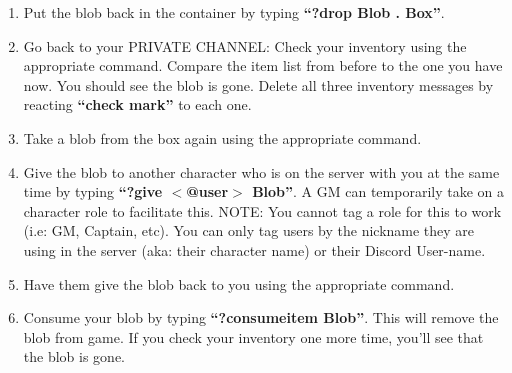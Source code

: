 \documentclass[green]{TMFHope}
\begin{document}
\begin{enumerate}
	\item Put the blob back in the container by typing \textbf{``?drop Blob . Box''}.
	\item Go back to your PRIVATE CHANNEL: Check your inventory using the appropriate command. Compare the item list from before to the one you have now. You should see the blob is gone. Delete all three inventory messages by reacting \textbf{``check mark''} to each one.
	\item Take a blob from the box again using the appropriate command.
	\item Give the blob to another character who is on the server with you at the same time by typing \textbf{``?give $<$@user$>$ Blob''}. A GM can temporarily take on a character role to facilitate this. NOTE: You cannot tag a role for this to work (i.e: GM, Captain, etc). You can only tag users by the nickname they are using in the server (aka: their character name) or their Discord User-name.
	\item Have them give the blob back to you using the appropriate command.
	\item Consume your blob by typing \textbf{``?consumeitem Blob''}. This will remove the blob from game. If you check your inventory one more time, you'll see that the blob is gone.
\end{enumerate}
\end{document}
